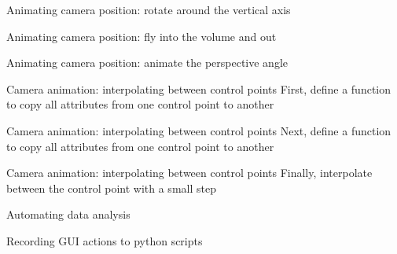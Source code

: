 \begin{frame}{Animating camera position: rotate around the vertical axis}
  
\end{frame}

\begin{frame}{Animating camera position: fly into the volume and out}
  
\end{frame}

\begin{frame}{Animating camera position: animate the perspective angle}
  
\end{frame}

\begin{frame}{Camera animation: interpolating between control points}
  First, define a function to copy all attributes from one control point to another
  
\end{frame}

\begin{frame}{Camera animation: interpolating between control points}
  Next, define a function to copy all attributes from one control point to another
  
\end{frame}

\begin{frame}{Camera animation: interpolating between control points}
  Finally, interpolate between the control point with a small step
  
\end{frame}






\begin{frame}{Automating data analysis}
\end{frame}

\begin{frame}{Recording GUI actions to python scripts}
\end{frame}

